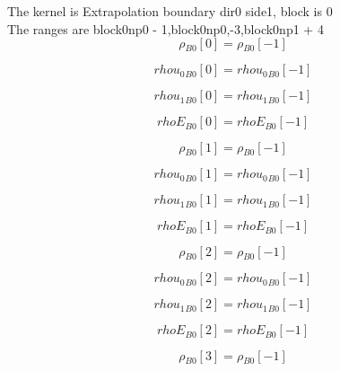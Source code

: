 \documentclass{article}
\begin{document}
\noindent The kernel is Extrapolation boundary dir0 side1, block is 0\\\noindent The ranges are block0np0 - 1,block0np0,-3,block0np1 + 4\\\begin{dmath}{\rho{_{B0}}}[{0}] = {\rho{_{B0}}}[{-1}]\end{dmath}

\begin{dmath}{rhou_{0}{_{B0}}}[{0}] = {rhou_{0}{_{B0}}}[{-1}]\end{dmath}

\begin{dmath}{rhou_{1}{_{B0}}}[{0}] = {rhou_{1}{_{B0}}}[{-1}]\end{dmath}

\begin{dmath}{rhoE{_{B0}}}[{0}] = {rhoE{_{B0}}}[{-1}]\end{dmath}

\begin{dmath}{\rho{_{B0}}}[{1}] = {\rho{_{B0}}}[{-1}]\end{dmath}

\begin{dmath}{rhou_{0}{_{B0}}}[{1}] = {rhou_{0}{_{B0}}}[{-1}]\end{dmath}

\begin{dmath}{rhou_{1}{_{B0}}}[{1}] = {rhou_{1}{_{B0}}}[{-1}]\end{dmath}

\begin{dmath}{rhoE{_{B0}}}[{1}] = {rhoE{_{B0}}}[{-1}]\end{dmath}

\begin{dmath}{\rho{_{B0}}}[{2}] = {\rho{_{B0}}}[{-1}]\end{dmath}

\begin{dmath}{rhou_{0}{_{B0}}}[{2}] = {rhou_{0}{_{B0}}}[{-1}]\end{dmath}

\begin{dmath}{rhou_{1}{_{B0}}}[{2}] = {rhou_{1}{_{B0}}}[{-1}]\end{dmath}

\begin{dmath}{rhoE{_{B0}}}[{2}] = {rhoE{_{B0}}}[{-1}]\end{dmath}

\begin{dmath}{\rho{_{B0}}}[{3}] = {\rho{_{B0}}}[{-1}]\end{dmath}
\end{document}
